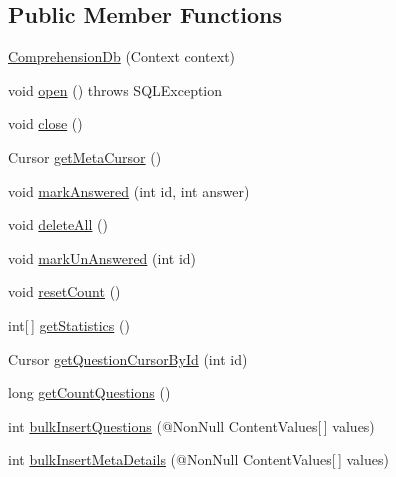 \subsection*{Public Member Functions}
\begin{DoxyCompactItemize}
\item 
\hyperlink{classorg_1_1buildmlearn_1_1toolkit_1_1comprehensiontemplate_1_1data_1_1ComprehensionDb_a60b2672f7c8f66e02fe62ebbebbc3bec}{Comprehension\+Db} (Context context)
\item 
void \hyperlink{classorg_1_1buildmlearn_1_1toolkit_1_1comprehensiontemplate_1_1data_1_1ComprehensionDb_aca8cf2abc2d08caf1d94bca5ab66f6ef}{open} ()  throws S\+Q\+L\+Exception 
\item 
void \hyperlink{classorg_1_1buildmlearn_1_1toolkit_1_1comprehensiontemplate_1_1data_1_1ComprehensionDb_a6fe16a726d76570ef223bf7b0592f4a4}{close} ()
\item 
Cursor \hyperlink{classorg_1_1buildmlearn_1_1toolkit_1_1comprehensiontemplate_1_1data_1_1ComprehensionDb_a50b7748c50e419099bd6b127b2e313ce}{get\+Meta\+Cursor} ()
\item 
void \hyperlink{classorg_1_1buildmlearn_1_1toolkit_1_1comprehensiontemplate_1_1data_1_1ComprehensionDb_a0ced60a113410ba1b164596fc5633670}{mark\+Answered} (int id, int answer)
\item 
void \hyperlink{classorg_1_1buildmlearn_1_1toolkit_1_1comprehensiontemplate_1_1data_1_1ComprehensionDb_a83ca9deee52d2318a7c6f59e1b5f3f4e}{delete\+All} ()
\item 
void \hyperlink{classorg_1_1buildmlearn_1_1toolkit_1_1comprehensiontemplate_1_1data_1_1ComprehensionDb_ac0086b702fae36baa42469b3a57364c6}{mark\+Un\+Answered} (int id)
\item 
void \hyperlink{classorg_1_1buildmlearn_1_1toolkit_1_1comprehensiontemplate_1_1data_1_1ComprehensionDb_ab7b93e9eaabd5b0d6ceb7c237fa8000a}{reset\+Count} ()
\item 
int\mbox{[}$\,$\mbox{]} \hyperlink{classorg_1_1buildmlearn_1_1toolkit_1_1comprehensiontemplate_1_1data_1_1ComprehensionDb_aad74f23060a5124e8f4bdc8202c2ca78}{get\+Statistics} ()
\item 
Cursor \hyperlink{classorg_1_1buildmlearn_1_1toolkit_1_1comprehensiontemplate_1_1data_1_1ComprehensionDb_ab1de81d645037cff9c16a9d10803ca77}{get\+Question\+Cursor\+By\+Id} (int id)
\item 
long \hyperlink{classorg_1_1buildmlearn_1_1toolkit_1_1comprehensiontemplate_1_1data_1_1ComprehensionDb_a64e8796817a51171086ecbe24396364d}{get\+Count\+Questions} ()
\item 
int \hyperlink{classorg_1_1buildmlearn_1_1toolkit_1_1comprehensiontemplate_1_1data_1_1ComprehensionDb_a677d224b9a34f8123f7dd3b62839d012}{bulk\+Insert\+Questions} (@Non\+Null Content\+Values\mbox{[}$\,$\mbox{]} values)
\item 
int \hyperlink{classorg_1_1buildmlearn_1_1toolkit_1_1comprehensiontemplate_1_1data_1_1ComprehensionDb_a8eca6fd3f5f142b53cbe0bc6f8b9038f}{bulk\+Insert\+Meta\+Details} (@Non\+Null Content\+Values\mbox{[}$\,$\mbox{]} values)
\end{DoxyCompactItemize}
